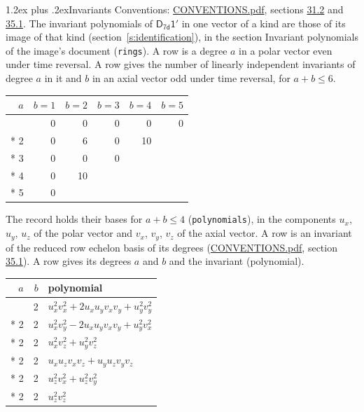 \documentclass[10pt,a4paper]{article}
\makeatletter
\renewcommand\section{\@startsection{section}{1}{\z@}{-3ex plus -1ex minus -.2ex}%
  {1.2ex plus .2ex}{\normalfont\large\sffamily\bfseries\color{parttitle}}}
\numberwithin{equation}{section}
\newcommand{\grp}[1]{\mathsf{#1}}
\makeatother
\begin{document}
\section{Invariants}\label{s:invariants}
Conventions: \href{../../CONVENTIONS.pdf}{CONVENTIONS.pdf}, sections \href{../../CONVENTIONS.pdf\#conv.31.2}{31.2} and \href{../../CONVENTIONS.pdf\#conv.35.1}{35.1}.
The invariant polynomials of $\grp{D_{7d}1'}$ in one vector of a kind are those of its image of that kind (section~\ref{s:identification}), in the section Invariant polynomials of the image's document (\texttt{rings}).
\leavevmode\label{n:index.degree.polar}\label{n:index.degree.axial}A row is a degree $a$ in a polar vector even under time reversal. A row gives the number of linearly independent invariants of degree $a$ in it and $b$ in an axial vector odd under time reversal, for $a + b \le 6$.
{\small\begin{longtable}{@{}rrrrrr@{}}\toprule
$a$ & $b = 1$ & $b = 2$ & $b = 3$ & $b = 4$ & $b = 5$\\\midrule\endhead
\bottomrule\endfoot\endlastfoot
1 & 0 & 0 & 0 & 0 & 0\\*
2 & 0 & 6 & 0 & 10 & \\*
3 & 0 & 0 & 0 &  & \\*
4 & 0 & 10 &  &  & \\*
5 & 0 &  &  &  & \\
\bottomrule\end{longtable}}
\leavevmode\label{n:local.component.polar}\label{n:local.component.axial}The record holds their bases for $a + b \le 4$ (\texttt{polynomials}), in the components $u_{x}$, $u_{y}$, $u_{z}$ of the polar vector and $v_{x}$, $v_{y}$, $v_{z}$ of the axial vector. \label{n:head.polynomial}A row is an invariant of the reduced row echelon basis of its degrees (\href{../../CONVENTIONS.pdf}{CONVENTIONS.pdf}, section \href{../../CONVENTIONS.pdf\#conv.35.1}{35.1}). A row gives its degrees $a$ and $b$ and the invariant (polynomial).
{\small\renewcommand{\arraystretch}{1.2}\begin{longtable}{@{}rrl@{}}\toprule
$a$ & $b$ & polynomial\\\midrule\endhead
\bottomrule\endfoot\endlastfoot
2 & 2 & $u_{x}^{2}v_{x}^{2} + 2u_{x}u_{y}v_{x}v_{y} + u_{y}^{2}v_{y}^{2}$\\*
2 & 2 & $u_{x}^{2}v_{y}^{2} - 2u_{x}u_{y}v_{x}v_{y} + u_{y}^{2}v_{x}^{2}$\\*
2 & 2 & $u_{x}^{2}v_{z}^{2} + u_{y}^{2}v_{z}^{2}$\\*
2 & 2 & $u_{x}u_{z}v_{x}v_{z} + u_{y}u_{z}v_{y}v_{z}$\\*
2 & 2 & $u_{z}^{2}v_{x}^{2} + u_{z}^{2}v_{y}^{2}$\\*
2 & 2 & $u_{z}^{2}v_{z}^{2}$\\
\bottomrule\end{longtable}}
\end{document}

